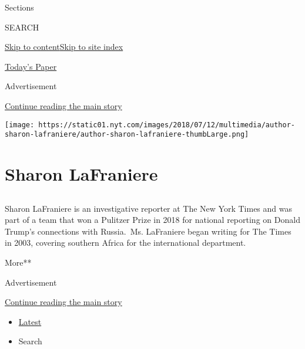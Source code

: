 Sections

SEARCH

\protect\hyperlink{site-content}{Skip to
content}\protect\hyperlink{site-index}{Skip to site index}

\href{https://myaccount.nytimes.com/auth/login?response_type=cookie\&client_id=vi}{}

\href{https://www.nytimes.com/section/todayspaper}{Today's Paper}

Advertisement

\protect\hyperlink{after-top}{Continue reading the main story}

\texttt{[image: https://static01.nyt.com/images/2018/07/12/multimedia/author-sharon-lafraniere/author-sharon-lafraniere-thumbLarge.png]}

\hypertarget{sharon-lafraniere}{%
\section{Sharon LaFraniere}\label{sharon-lafraniere}}

\subsection{}

Sharon LaFraniere is an investigative reporter at The New York Times and
was part of a team that won a Pulitzer Prize in 2018 for national
reporting on Donald Trump's connections with Russia.~Ms. LaFraniere
began writing for The Times in 2003, covering southern Africa for the
international department.

More**

Advertisement

\protect\hyperlink{after-mid1}{Continue reading the main story}

\begin{itemize}
\tightlist
\item
  \protect\hyperlink{stream-panel}{Latest}
\item
  Search
\end{itemize}

